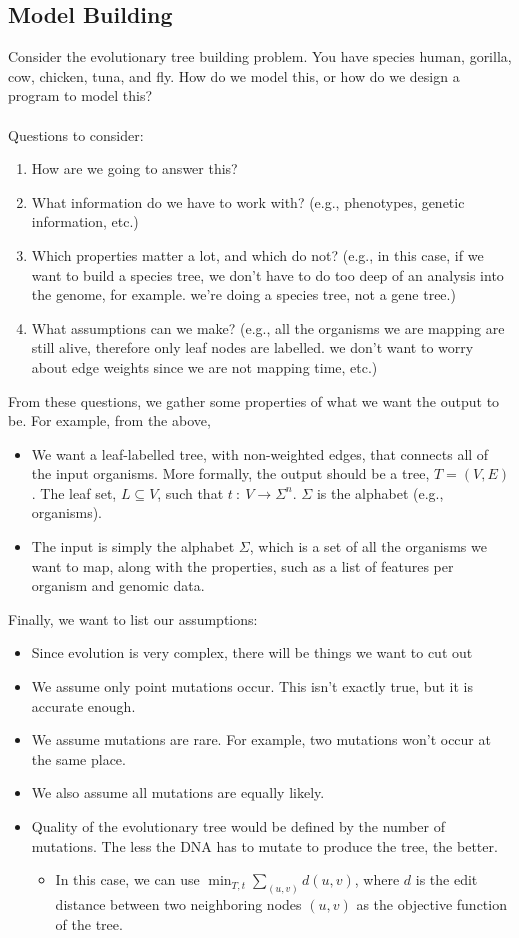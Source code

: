 \documentclass[10pt]{article}
\begin{document}
\subsection*{Model Building}
Consider the evolutionary tree building problem.  You have species human, gorilla, cow, chicken, tuna, and fly.  How do we model this, or how do we design a program to model this?\\\\
Questions to consider:
\begin{enumerate}
	\item How are we going to answer this?
	\item What information do we have to work with?  (e.g., phenotypes, genetic information, etc.)
	\item Which properties matter a lot, and which do not?  (e.g., in this case, if we want to build a species tree, we don't have to do too deep of an analysis into the genome, for example.  we're doing a species tree, not a gene tree.)
	\item What assumptions can we make?  (e.g., all the organisms we are mapping are still alive, therefore only leaf nodes are labelled.  we don't want to worry about edge weights since we are not mapping time, etc.)
\end{enumerate}
From these questions, we gather some properties of what we want the output to be.  
For example, from the above, 
\begin{itemize}
    \item We want a leaf-labelled tree, with non-weighted edges, that connects all of the input organisms.  More formally, the output should be a tree, $T = (V, E)$.  The leaf set, $L \subseteq V$, such that $t \::\: V \rightarrow \Sigma^n$.  $\Sigma$ is the alphabet (e.g., organisms).
    \item The input is simply the alphabet $\Sigma$, which is a set of all the organisms we want to map, along with the properties, such as a list of features per organism and genomic data.
\end{itemize}
Finally, we want to list our assumptions:
\begin{itemize}
    \item Since evolution is very complex, there will be things we want to cut out
    \item We assume only point mutations occur.  This isn't exactly true, but it is accurate enough.
    \item We assume mutations are rare.  For example, two mutations won't occur at the same place.
    \item We also assume all mutations are equally likely.
    \item Quality of the evolutionary tree would be defined by the number of mutations.  The less the DNA has to mutate to produce the tree, the better.
    \begin{itemize}
        \item In this case, we can use $\min_{T, t} \sum_{(u, v)} d(u, v)$, where $d$ is the edit distance between two neighboring nodes $(u, v)$ as the objective function of the tree.
    \end{itemize}
\end{itemize}
\end{document}
